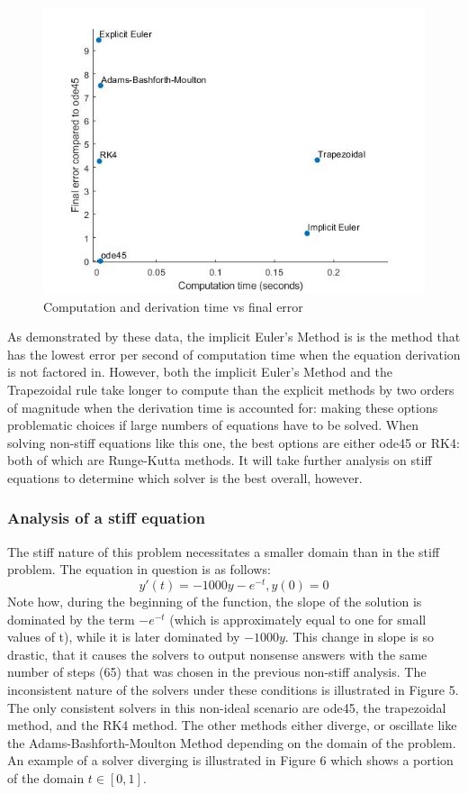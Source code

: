 \documentclass[11pt]{article}
\begin{document}
\begin{figure} [h]
\centering
        \includegraphics[totalheight=10cm]{scatter2.jpg}
    \caption{Computation and derivation time vs final error}
    \label{figure4}
\end{figure}

As demonstrated by these data, the implicit Euler's Method is is the method 
that has the lowest error per second of computation time when the equation
derivation is not factored in. However, both the implicit Euler's Method and 
the Trapezoidal rule take longer to compute than the explicit methods by two orders
of magnitude when the derivation time is accounted for: making these options
problematic choices if large numbers of equations have to be solved. When solving
non-stiff equations like this one, the best options are either ode45 or RK4: both
of which are Runge-Kutta methods. It will take further analysis on stiff equations
to determine which solver is the best overall, however.

\subsubsection{Analysis of a stiff equation}
%
The stiff nature of this problem necessitates a 
smaller domain than in the stiff problem. The equation in question is as follows: 
$$y'(t)=-1000y-e^{-t}, y(0)=0$$
Note how, during the beginning of the function, the slope of the solution is 
dominated by the term $-e^{-t}$ (which is approximately equal to one for small 
values of t), while it is later dominated by $-1000y$. This change in slope is so
drastic, that it causes the solvers to output nonsense answers with the same
number of steps (65) that was chosen in the previous
non-stiff analysis. The inconsistent nature of the solvers under these conditions
is illustrated in Figure 5. The only consistent solvers in this non-ideal scenario
are ode45, the trapezoidal method, and the RK4 method. The other methods either
diverge, or oscillate like the Adams-Bashforth-Moulton Method depending on the 
domain of the problem. An example of a solver diverging is illustrated in Figure
6 which shows a portion of the domain $t\in [0,1]$.
\end{document}
